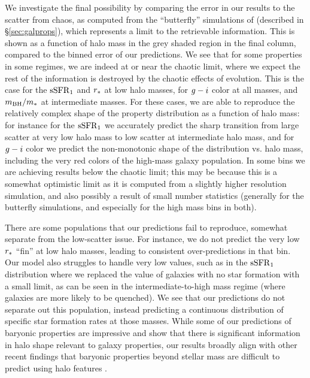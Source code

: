 We investigate the final possibility by comparing the error in our results to the scatter from chaos, as computed from the ``butterfly'' simulations of \cite{Genel2019} (described in \S\ref{sec:galprops}), which represents a limit to the retrievable information.
This is shown as a function of halo mass in the grey shaded region in the final column, compared to the binned error of our predictions.
We see that for some properties in some regimes, we are indeed at or near the chaotic limit, where we expect the rest of the information is destroyed by the chaotic effects of evolution.
This is the case for the $\mathrm{sSFR}_1$ and $r_*$ at low halo masses, for $g-i$ color at all masses, and $m_\mathrm{BH}/m_*$ at intermediate masses.
For these cases, we are able to reproduce the relatively complex shape of the property distribution as a function of halo mass: for instance for the $\mathrm{sSFR}_1$ we accurately predict the sharp transition from large scatter at very low halo mass to low scatter at intermediate halo mass, and for $g-i$ color we predict the non-monotonic shape of the distribution vs. halo mass, including the very red colors of the high-mass galaxy population.
In some bins we are achieving results below the chaotic limit; this may be because this is a somewhat optimistic limit as it is computed from a slightly higher resolution simulation, and also possibly a result of small number statistics (generally for the butterfly simulations, and especially for the high mass bins in both).

There are some populations that our predictions fail to reproduce, somewhat separate from the low-scatter issue.
For instance, we do not predict the very low $r_*$ ``fin'' at low halo masses, leading to consistent over-predictions in that bin.
Our model also struggles to handle very low values, such as in the $\mathrm{sSFR}_1$ distribution where we replaced the value of galaxies with no star formation with a small limit, as can be seen in the intermediate-to-high mass regime (where galaxies are more likely to be quenched).
We see that our predictions do not separate out this population, instead predicting a continuous distribution of specific star formation rates at those masses.
While some of our predictions of baryonic properties are impressive and show that there is significant information in halo shape relevant to galaxy properties, our results broadly align with other recent findings that baryonic properties beyond stellar mass are difficult to predict using halo features \citep{de_santi_mimicking_2021,stiskalek_scatter_2022}.

